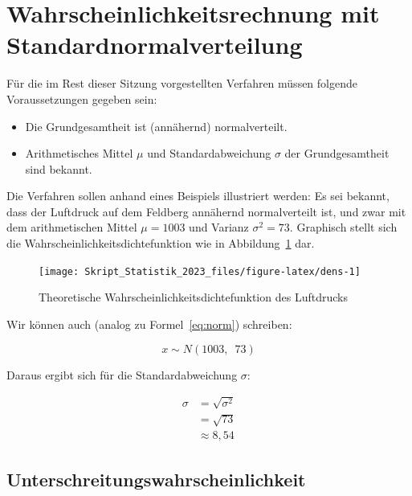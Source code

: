 \documentclass[
  11pt,
  ngerman,
  a4paper,
]{report}
\providecommand{\tightlist}{%
  \setlength{\itemsep}{0pt}\setlength{\parskip}{0pt}}
\begin{document}
\hypertarget{wahrscheinlichkeitsrechnung-mit-standardnormalverteilung}{%
\section{Wahrscheinlichkeitsrechnung mit Standardnormalverteilung}\label{wahrscheinlichkeitsrechnung-mit-standardnormalverteilung}}

Für die im Rest dieser Sitzung vorgestellten Verfahren müssen folgende Voraussetzungen gegeben sein:

\begin{itemize}
\tightlist
\item
  Die Grundgesamtheit ist (annähernd) normalverteilt.
\item
  Arithmetisches Mittel \(\mu\) und Standardabweichung \(\sigma\) der Grundgesamtheit sind bekannt.
\end{itemize}

Die Verfahren sollen anhand eines Beispiels illustriert werden: Es sei bekannt, dass der Luftdruck auf dem Feldberg annähernd normalverteilt ist, und zwar mit dem arithmetischen Mittel \(\mu=1003\) und Varianz \(\sigma^2=73\). Graphisch stellt sich die Wahrscheinlichkeitsdichtefunktion wie in Abbildung~\ref{fig:dens} dar.

\begin{figure}[t]

{\centering \texttt{[image: Skript\_Statistik\_2023\_files/figure-latex/dens-1]} 

}

\caption{Theoretische Wahrscheinlichkeitsdichtefunktion des Luftdrucks}\label{fig:dens}
\end{figure}

Wir können auch (analog zu Formel~\eqref{eq:norm}) schreiben:

\[
x \sim N(1003,\enspace73)
\]

Daraus ergibt sich für die Standardabweichung \(\sigma\):
\nopagebreak

\[\begin{aligned}
\sigma&=\sqrt{\sigma^2}\\
&=\sqrt{73}\\
&\approx8{,}54
\end{aligned}\]

\hypertarget{unter}{%
\subsection{Unterschreitungswahrscheinlichkeit}\label{unter}}
\end{document}
